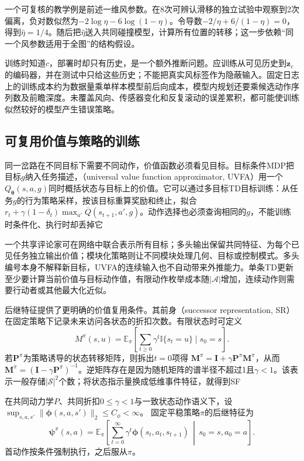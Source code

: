 一个可复核的教学例是前述一维风参数。在8次可辨认滑移的独立试验中观察到2次偏离，负对数似然为$-2\log\eta-6\log(1-\eta)$。令导数$-2/\eta+6/(1-\eta)=0$，得到$\widehat\eta=1/4$。随后把$\widehat\eta$送入共同碰撞模型，计算所有位置的转移；这一步依赖“同一个风参数适用于全图”的结构假设。

训练时知道$c$，部署时却只有历史，是一个额外推断问题。应训练从可见历史到$\bm z_c$的编码器，并在测试中只给这些历史；不能把真实风标签作为隐蔽输入。固定日志上的训练成本约为数据量乘单样本模型前后向成本，模型内规划还要乘候选动作序列数及前瞻深度。未覆盖风向、传感器变化和反复滚动的误差累积，都可能使训练似然较好的模型产生错误策略。

\subsection{可复用价值与策略的训练}
\label{sec:rl-transfer-value-training}

同一岔路在不同目标下需要不同动作，价值函数必须看见目标。目标条件MDP把目标$g$纳入任务描述，（universal value function approximator, UVFA）用一个$Q_{\bm\theta}(s,a,g)$同时概括状态与目标上的价值。它可以通过多目标TD目标训练：从任务$g$的行为策略采样，按该目标重算奖励和终止，拟合$r_t+\gamma(1-\delta_t)\max_{a'}\overline Q(s_{t+1},a',g)$。动作选择也必须查询相同的$g$，不能训练时条件化、执行时却丢掉它

一个共享评论家可在网络中联合表示所有目标；多头输出保留共同特征、为每个已见任务独立输出价值；模块化策略则让不同模块处理几何、目标或控制模式。多头编号本身不解释新目标，UVFA的连续输入也不自动带来外推能力。单条TD更新至少要计算当前价值与目标动作值，有限动作枚举成本随$|\mathcal A|$增加，连续动作则需要行动者或其他最大化近似。

后继特征提供了更明确的价值复用条件。其前身（successor representation, SR）在固定策略下记录未来访问各状态的折扣次数。有限状态时可定义
\[
 M^\pi(s,u)=\mathbb E_\pi\!\left[\sum_{t\geq0}\gamma^t
       \mathbb I\{s_t=u\}\mid s_0=s\right].
\]
若$\bm P^\pi$为策略诱导的状态转移矩阵，则拆出$t=0$项得
$\bm M^\pi=\bm I+\gamma\bm P^\pi\bm M^\pi$，从而
$\bm M^\pi=(\bm I-\gamma\bm P^\pi)^{-1}$。逆矩阵存在是因为随机矩阵的谱半径不超过1且$\gamma<1$。该表示一般存储$|\mathcal S|^2$个数；将状态指示量换成低维事件特征，就得到SF

\begin{definition}[固定策略的后继特征]
 \label{def:rl-transfer-sf}
 在共同动力学$P$、共同折扣$0\leq\gamma<1$与一致状态动作语义下，设
 $\sup_{s,a,s'}\lVert\bm\phi(s,a,s')\rVert_2\leq C_\phi<\infty$。
 固定平稳策略$\pi$的后继特征为
 \begin{equation}
 \bm\psi^\pi(s,a)=
 \mathbb E_\pi\!\left[
 \sum_{t=0}^{\infty}\gamma^t\bm\phi(s_t,a_t,s_{t+1})
 \,\middle|\,s_0=s,a_0=a\right].
 \label{eq:rl-transfer-sf}
 \end{equation}
 首动作按条件强制执行，之后服从$\pi$。
\end{definition}

